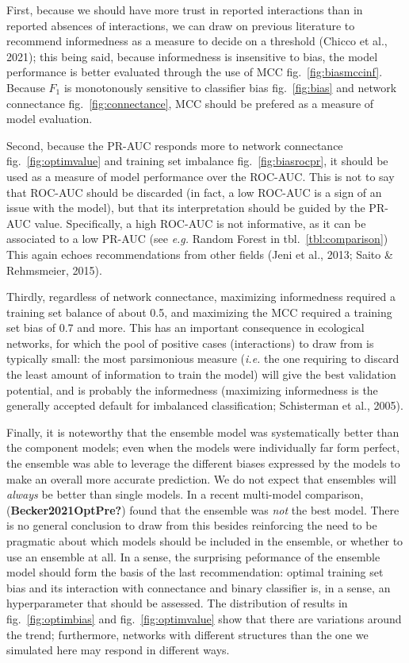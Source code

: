 \documentclass[11pt]{article}
\begin{document}
First, because we should have more trust in reported interactions than
in reported absences of interactions, we can draw on previous literature
to recommend informedness as a measure to decide on a threshold (Chicco
et al., 2021); this being said, because informedness is insensitive to
bias, the model performance is better evaluated through the use of MCC
fig.~\ref{fig:biasmccinf}. Because \(F_1\) is monotonously sensitive to
classifier bias fig.~\ref{fig:bias} and network connectance
fig.~\ref{fig:connectance}, MCC should be prefered as a measure of model
evaluation.

Second, because the PR-AUC responds more to network connectance
fig.~\ref{fig:optimvalue} and training set imbalance
fig.~\ref{fig:biasrocpr}, it should be used as a measure of model
performance over the ROC-AUC. This is not to say that ROC-AUC should be
discarded (in fact, a low ROC-AUC is a sign of an issue with the model),
but that its interpretation should be guided by the PR-AUC value.
Specifically, a high ROC-AUC is not informative, as it can be associated
to a low PR-AUC (see \emph{e.g.} Random Forest in
tbl.~\ref{tbl:comparison}) This again echoes recommendations from other
fields (Jeni et al., 2013; Saito \& Rehmsmeier, 2015).

Thirdly, regardless of network connectance, maximizing informedness
required a training set balance of about 0.5, and maximizing the MCC
required a training set bias of 0.7 and more. This has an important
consequence in ecological networks, for which the pool of positive cases
(interactions) to draw from is typically small: the most parsimonious
measure (\emph{i.e.} the one requiring to discard the least amount of
information to train the model) will give the best validation potential,
and is probably the informedness (maximizing informedness is the
generally accepted default for imbalanced classification; Schisterman et
al., 2005).

Finally, it is noteworthy that the ensemble model was systematically
better than the component models; even when the models were individually
far form perfect, the ensemble was able to leverage the different biases
expressed by the models to make an overall more accurate prediction. We
do not expect that ensembles will \emph{always} be better than single
models. In a recent multi-model comparison, (\textbf{Becker2021OptPre?})
found that the ensemble was \emph{not} the best model. There is no
general conclusion to draw from this besides reinforcing the need to be
pragmatic about which models should be included in the ensemble, or
whether to use an ensemble at all. In a sense, the surprising peformance
of the ensemble model should form the basis of the last recommendation:
optimal training set bias and its interaction with connectance and
binary classifier is, in a sense, an hyperparameter that should be
assessed. The distribution of results in fig.~\ref{fig:optimbias} and
fig.~\ref{fig:optimvalue} show that there are variations around the
trend; furthermore, networks with different structures than the one we
simulated here may respond in different ways.
\end{document}
